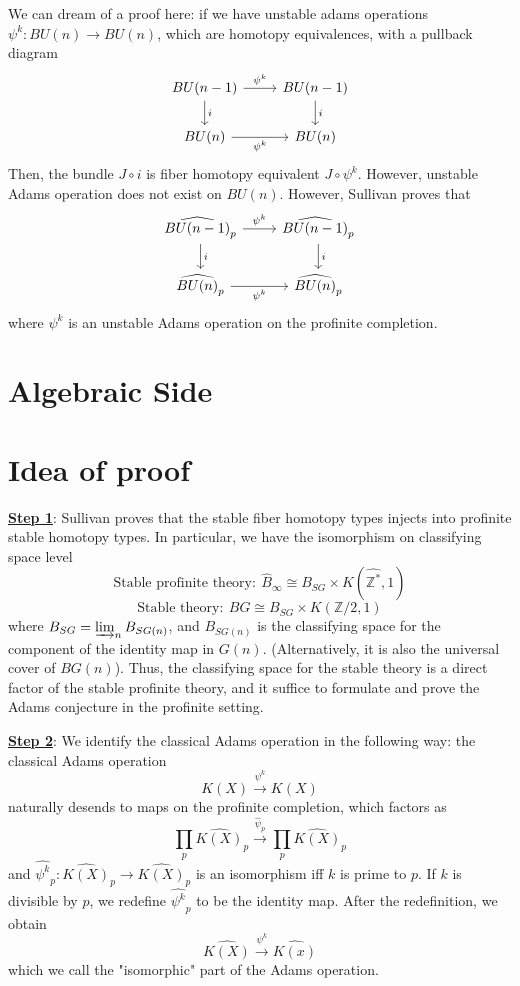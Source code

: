 \documentclass{article}
\theoremstyle{definition}
\theoremstyle{definition}
\theoremstyle{definition}
\theoremstyle{definition}
\theoremstyle{definition}
\theoremstyle{definition}
\theoremstyle{definition}
\begin{document}
We can dream of a proof here: if we have unstable adams operations $\psi^k: BU(n)\to BU(n)$, which are homotopy equivalences, with a pullback diagram
\[\begin{tikzcd}
	{BU(n-1)} & {BU(n-1)} \\
	{BU(n)} & {BU(n)}
	\arrow["{\psi^k}", from=1-1, to=1-2]
	\arrow["i", from=1-1, to=2-1]
	\arrow["i", from=1-2, to=2-2]
	\arrow["{\psi^k}"', from=2-1, to=2-2]
\end{tikzcd}\]
Then, the bundle $J\circ i$ is fiber homotopy equivalent $J\circ \psi^k$. However, unstable Adams operation does not exist on $BU(n)$. However, Sullivan proves that 
\[\begin{tikzcd}
	{\widehat{BU(n-1)}_p} & {\widehat{BU(n-1)}_p} \\
	{\widehat{BU(n)}_p} & {\widehat{BU(n)}_p}
	\arrow["{\psi^k}", from=1-1, to=1-2]
	\arrow["i", from=1-1, to=2-1]
	\arrow["i", from=1-2, to=2-2]
	\arrow["{\psi^k}"', from=2-1, to=2-2]
\end{tikzcd}\]
where $\psi^k$ is an unstable Adams operation on the profinite completion. 







\section{Algebraic Side}



\section*{Idea of proof}

\underline{\textbf{Step 1}}: Sullivan proves that the stable fiber homotopy types injects into profinite stable homotopy types. In particular, we have the isomorphism on classifying space level 
\[\textrm{Stable profinite theory}: \ \widehat{B}_{\infty}\cong B_{SG}\times K(\widehat{\mathbb{Z}^*},1)\]
\[\textrm{Stable theory}: \ BG\cong B_{SG}\times K(\mathbb{Z}/2,1)\]
where $B_{SG}=\varinjlim_n B_{SG(n)}$, and $B_{SG(n)}$ is the classifying space for the component of the identity map in $G(n)$. (Alternatively, it is also the universal cover of $BG(n)$). Thus, the classifying space for the stable theory is a direct factor of the stable profinite theory, and it suffice to formulate and prove the Adams conjecture in the profinite setting. 

\underline{\textbf{Step 2}}: We identify the classical Adams operation in the following way: the classical Adams operation 
\[K(X)\xrightarrow{\psi^k}K(X)\]
naturally desends to maps on the profinite completion, which factors as 
\[\prod_p \widehat{K(X)}_p\xrightarrow{\widehat{\psi}_p} \prod_p \widehat{K(X)}_p\]
and $\widehat{\psi^k}_p: \widehat{K(X)}_p\to \widehat{K(X)}_p$ is an isomorphism iff $k$ is prime to $p$. If $k$ is divisible by $p$, we redefine $\widehat{\psi^k}_p$ to be the identity map. After the redefinition, we obtain 
\[\widehat{K(X)}\xrightarrow{\psi^k}\widehat{K(x)}\]
which we call the "isomorphic" part of the Adams operation. 
\end{document}
